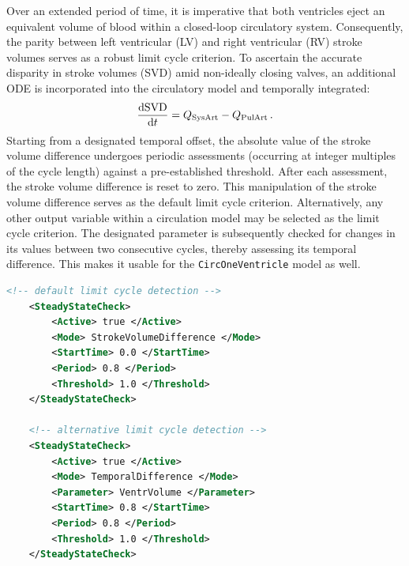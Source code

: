 Over an extended period of time, it is imperative that both ventricles eject an equivalent volume of blood within a closed-loop circulatory system. 
Consequently, the parity between left ventricular (LV) and right ventricular (RV) stroke volumes serves as a robust limit cycle criterion. 
To ascertain the accurate disparity in stroke volumes (SVD) amid non-ideally closing valves, an additional ODE is incorporated into the circulatory model and temporally integrated:
\begin{equation}
    \dv{\mathrm{SVD}}{t} = Q_\mathrm{SysArt} - Q_\mathrm{PulArt}\,.
\end{equation}
Starting from a designated temporal offset, the absolute value of the stroke volume difference undergoes periodic assessments (occurring at integer multiples of the cycle length) against a pre-established threshold. 
After each assessment, the stroke volume difference is reset to zero. 
This manipulation of the stroke volume difference serves as the default limit cycle criterion.
Alternatively, any other output variable within a circulation model may be selected as the limit cycle criterion. 
The designated parameter is subsequently checked for changes in its values between two consecutive cycles, thereby assessing its temporal difference.
This makes it usable for the \verb|CircOneVentricle| model as well.

\begin{lstlisting}[language=XML,caption=.xml settings for a limit cycle check for all circulation models (subkey of <Circulation><Circs><Circ\_X>)]
    <!-- default limit cycle detection -->
    <SteadyStateCheck>
        <Active> true </Active>
        <Mode> StrokeVolumeDifference </Mode>
        <StartTime> 0.0 </StartTime>
        <Period> 0.8 </Period>
        <Threshold> 1.0 </Threshold>
    </SteadyStateCheck>

    <!-- alternative limit cycle detection -->
    <SteadyStateCheck>
        <Active> true </Active>
        <Mode> TemporalDifference </Mode>
        <Parameter> VentrVolume </Parameter>
        <StartTime> 0.8 </StartTime>
        <Period> 0.8 </Period>
        <Threshold> 1.0 </Threshold>
    </SteadyStateCheck>
\end{lstlisting}

